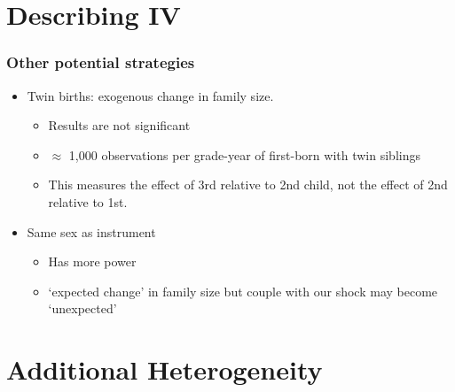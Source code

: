 \documentclass{beamer}
\begin{document}
\section{Describing IV}

\begin{frame}
    \label{frame:otherstrategies}
    \frametitle{Other potential strategies}
        \begin{itemize}
            \item Twin births: exogenous change in family size.
            \begin{itemize}
                \item Results are not significant
                \item $\approx$ 1,000 observations per grade-year of first-born with twin siblings
                \item This measures the effect of 3rd relative to 2nd child, not the effect of 2nd relative to 1st.
            \end{itemize}
            \item Same sex as instrument
            \begin{itemize}
                \item Has more power
                \item `expected change' in family size but couple with our shock may become `unexpected'
            \end{itemize}
            
        \end{itemize}
     

\end{frame}


\section{Additional Heterogeneity}
\end{document}

